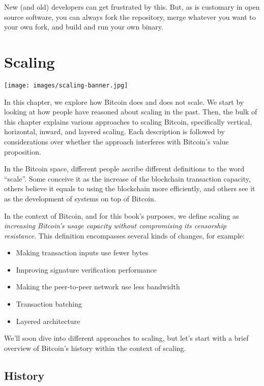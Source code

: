 New (and old) developers can get frustrated by this. But, as is
customary in open source software, you can always fork the repository,
merge whatever you want to your own fork, and build and run your own
binary.

\hypertarget{scaling}{%
\section{Scaling}\label{scaling}}

\texttt{[image: images/scaling-banner.jpg]}

In this chapter, we explore how Bitcoin does and does not scale. We
start by looking at how people have reasoned about scaling in the past.
Then, the bulk of this chapter explains various approaches to scaling
Bitcoin, specifically vertical, horizontal, inward, and layered scaling.
Each description is followed by considerations over whether the approach
interferes with Bitcoin's value proposition.

In the Bitcoin space, different people ascribe different definitions to
the word ``scale''. Some conceive it as the increase of the blockchain
transaction capacity, others believe it equals to using the blockchain
more efficiently, and others see it as the development of systems on top
of Bitcoin.

In the context of Bitcoin, and for this book's purposes, we define
scaling as \emph{increasing Bitcoin's usage capacity without
compromising its censorship resistance}. This definition encompasses
several kinds of changes, for example:

\begin{itemize}
\item
  Making transaction inputs use fewer bytes
\item
  Improving signature verification performance
\item
  Making the peer-to-peer network use less bandwidth
\item
  Transaction batching
\item
  Layered architecture
\end{itemize}

We'll soon dive into different approaches to scaling, but let's start
with a brief overview of Bitcoin's history within the context of
scaling.

\hypertarget{_history}{%
\subsection{History}\label{_history}}

